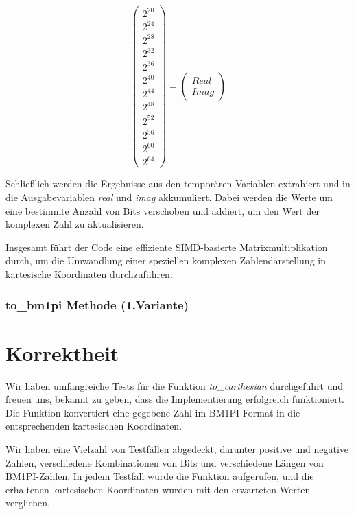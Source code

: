 \documentclass[course=erap]{aspdoc}
\begin{document}
\[\begin{pmatrix}
            2^{20} \\
            2^{24} \\
            2^{28} \\
            2^{32} \\
            2^{36} \\
            2^{40} \\
            2^{44} \\
            2^{48} \\
            2^{52} \\
            2^{56} \\
            2^{60} \\
            2^{64}
        \end{pmatrix}
        =
        \begin{pmatrix}
            \textit{Real} \\
            \textit{Imag}
        \end{pmatrix}
    \]
    \newline
    \newline

    Schließlich werden die Ergebnisse aus den temporären Variablen extrahiert und in die Ausgabevariablen \textit{real} und \textit{imag} akkumuliert. Dabei werden die Werte um eine bestimmte Anzahl von Bits verschoben und addiert, um den Wert der komplexen Zahl zu aktualisieren.

    Insgesamt führt der Code eine effiziente SIMD-basierte Matrixmultiplikation durch, um die Umwandlung einer speziellen komplexen Zahlendarstellung in kartesische Koordinaten durchzuführen.

    \subsubsection{to\_bm1pi Methode (1.Variante)}



    \section{Korrektheit}
    Wir haben umfangreiche Tests für die Funktion \textit{to\_carthesian} durchgeführt und freuen uns, bekannt zu geben, dass die Implementierung erfolgreich funktioniert. Die Funktion konvertiert eine gegebene Zahl im BM1PI-Format in die entsprechenden kartesischen Koordinaten.

    Wir haben eine Vielzahl von Testfällen abgedeckt, darunter positive und negative Zahlen, verschiedene Kombinationen von Bits und verschiedene Längen von BM1PI-Zahlen. In jedem Testfall wurde die Funktion aufgerufen, und die erhaltenen kartesischen Koordinaten wurden mit den erwarteten Werten verglichen.
\end{document}
